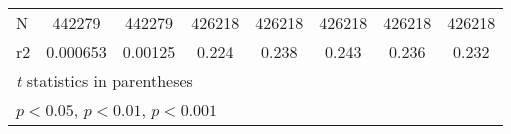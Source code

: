 {\begin{tabular}{l*{7}{c}}
N                   &      442279         &      442279         &      426218         &      426218         &      426218         &      426218         &      426218         \\
r2                  &    0.000653         &     0.00125         &       0.224         &       0.238         &       0.243         &       0.236         &       0.232         \\
\hline\hline
\multicolumn{8}{l}{\footnotesize \textit{t} statistics in parentheses}\\
\multicolumn{8}{l}{\footnotesize \sym{*} \(p<0.05\), \sym{**} \(p<0.01\), \sym{***} \(p<0.001\)}\\
\end{tabular}
}
